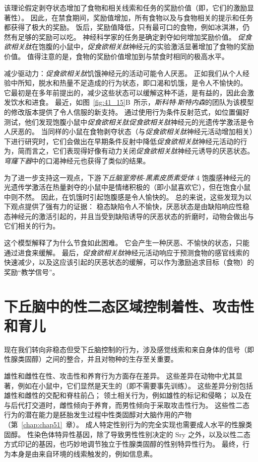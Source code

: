 该理论假定剥夺状态增加了食物和相关线索和任务的奖励价值（即，它们的激励显著性）。
因此，在禁食期间，奖励值增加，所有食物以及与食物相关的提示和任务都获得了极大的奖励。
饭后，奖励值降低，只有最可口的食物，例如冰淇淋，仍然有足够的奖励可以吃。
神经科学家的任务是确定剥夺如何增加奖励价值。
\textit{促食欲相关肽}在饱腹的小鼠中，\textit{促食欲相关肽}神经元的实验激活显著增加了食物的奖励价值。
值得注意的是，食物的奖励价值增加到与禁食时相同的极高水平。


减少驱动力：\textit{促食欲相关肽}饥饿神经元的活动可能令人厌恶。
正如我们从个人经验中所知，脱水和热量不足造成的行为状态，即口渴和饥饿，是令人不愉快的。
它最初是在多年前提出的，减少这些状态可以缓解这种不适，是有益的，因此会激发饮水和进食。
最近，如图~\ref{fig:41_15}B~所示，\textit{斯科特$\cdot$斯特内森}的团队为该模型的修改版本提供了令人信服的新支持。
通过使用行为条件反射范式，如位置偏好测试，他们发现饱腹小鼠中\textit{促食欲相关肽}\textit{促食欲相关肽}神经元的光遗传学激活是令人厌恶的。
当同样的小鼠在食物剥夺状态（与\textit{促食欲相关肽}神经元活动增加相关）下进行研究时，它们会做出在早期条件反射中降低\textit{促食欲相关肽}神经元活动的行为，简而言之，它们表现得好像有动力关闭\textit{促食欲相关肽}神经元诱导的厌恶状态。
\textit{穹窿下器}中的口渴神经元也获得了类似的结果。


为了进一步支持这一观点，下游\textit{下丘脑室旁核}-\textit{黑素皮质素受体} 4 饱腹感神经元的光遗传学激活在热量剥夺的小鼠中是情绪积极的（即小鼠喜欢它），但在饱食小鼠中则不然。
因此，在饥饿时引起饱腹感是令人愉快的。
总的来说，这些发现为以下观点提供了强有力的证据：
稳态缺陷令人不愉快，厌恶状态是由缺陷响应性稳态神经元的激活引起的，并且当受到缺陷诱导的厌恶状态的折磨时，动物会做出与它们相关的行为。


这个模型解释了为什么节食如此困难。
它会产生一种厌恶、不愉快的状态，只能通过进食来缓解。
最后，\textit{促食欲相关肽}神经元活动响应于预测食物的感官线索的快速减少，以及这应该引起的厌恶状态的缓解，可以作为激励追求目标（食物）的奖励“教学信号”。



\section{下丘脑中的性二态区域控制着性、攻击性和育儿}

现在我们转向非稳态但受下丘脑控制的行为，涉及感觉线索和来自身体的信号（即性腺类固醇）之间的整合，并且对物种的生存至关重要。


雄性和雌性在性、攻击性和养育行为方面存在差异。
这些差异在动物中尤其显著，例如在小鼠中，它们显然是天生的（即不需要事先训练）。
这些差异分别包括雄性和雌性的交配和脊柱前凸；
领土相关行为，例如雄性的标记和侵略；
以及在与后代打交道时，雌性倾向于养育，而男性倾向于采取攻击性行为。
这些性二态行为的潜在能力是胚胎发生过程中性类固醇对大脑作用的产物（第~\ref{chap:chap51}~章）。
成人特定性别行为的完全实现也需要成人水平的性腺类固醇。
性染色体特异性基因，除了导致男性性别决定的 Sry 之外，以及以性二态方式印记的基因，也巧妙地调节独立于性腺类固醇的性别特异性行为。
最终，行为本身是由来自环境的线索触发的，例如信息素。


